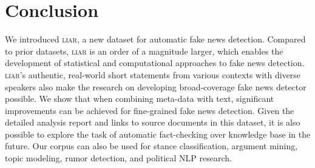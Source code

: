 \documentclass[11pt,a4paper]{article}
\begin{document}
\section{Conclusion}
We introduced \textsc{liar}, a new dataset for automatic fake news detection. Compared to prior datasets, \textsc{liar} is an order of a magnitude larger,
which enables the development of statistical and computational approaches to fake news detection. \textsc{liar}'s authentic, real-world short statements from various contexts with diverse speakers also make the research on developing broad-coverage fake news detector possible. We show that when combining meta-data with text, significant improvements can be achieved for fine-grained fake news detection. Given the detailed analysis report and links to source documents in this dataset, it is also possible to explore the task of automatic fact-checking over knowledge base in the future. Our corpus can also be used for stance classification, argument mining, topic modeling, rumor detection, and political NLP research. 



\appendix
\end{document}
